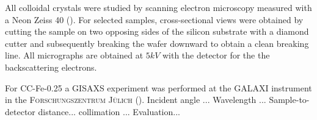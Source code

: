 \documentclass[\main/dresen_thesis.tex]{subfiles}
\begin{document}
    All colloidal crystals were studied by scanning electron microscopy measured with a Neon Zeiss 40 ().
    For selected samples, cross-sectional views were obtained by cutting the sample on two opposing sides of the silicon substrate with a diamond cutter and subsequently breaking the wafer downward to obtain a clean breaking line.
    All micrographs are obtained at $5 \unit{kV}$ with the detector for the the backscattering electrons.

    For CC-Fe-0.25 a GISAXS experiment was performed at the GALAXI instrument in the \textsc{Forschungszentrum J\"ulich} ().
    Incident angle ...
    Wavelength ... 
    Sample-to-detector distance...
    collimation ...
    Evaluation...
\end{document}
